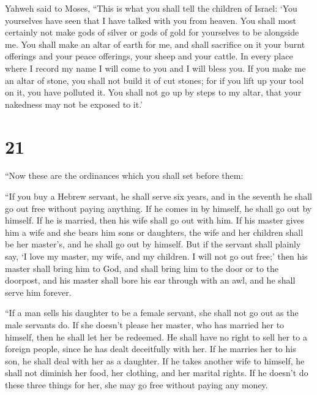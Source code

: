  Yahweh said to Moses, ``This is what you shall tell the
children of Israel: `You yourselves have seen that I have talked with
you from heaven.  You shall most certainly not make gods
of silver or gods of gold for yourselves to be alongside me.
 You shall make an altar of earth for me, and shall
sacrifice on it your burnt offerings and your peace offerings, your
sheep and your cattle. In every place where I record my name I will come
to you and I will bless you.  If you make me an altar of
stone, you shall not build it of cut stones; for if you lift up your
tool on it, you have polluted it.  You shall not go up by
steps to my altar, that your nakedness may not be exposed to it.'

\hypertarget{section-20}{%
\section{21}\label{section-20}}

 ``Now these are the ordinances which you shall set before
them:

 ``If you buy a Hebrew servant, he shall serve six years,
and in the seventh he shall go out free without paying anything.
 If he comes in by himself, he shall go out by himself. If
he is married, then his wife shall go out with him.  If
his master gives him a wife and she bears him sons or daughters, the
wife and her children shall be her master's, and he shall go out by
himself.  But if the servant shall plainly say, `I love my
master, my wife, and my children. I will not go out free;'
 then his master shall bring him to God, and shall bring
him to the door or to the doorpost, and his master shall bore his ear
through with an awl, and he shall serve him forever.

 ``If a man sells his daughter to be a female servant, she
shall not go out as the male servants do.  If she doesn't
please her master, who has married her to himself, then he shall let her
be redeemed. He shall have no right to sell her to a foreign people,
since he has dealt deceitfully with her.  If he marries
her to his son, he shall deal with her as a daughter.  If
he takes another wife to himself, he shall not diminish her food, her
clothing, and her marital rights.  If he doesn't do these
three things for her, she may go free without paying any money.

